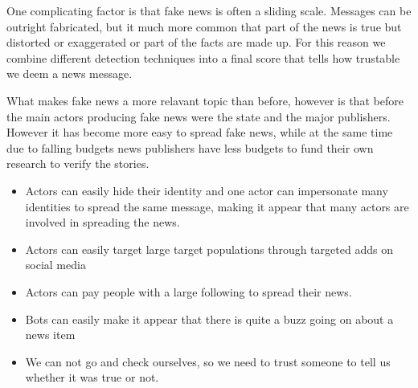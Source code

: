 \documentclass[10pt, a4paper, twocolumn]{article} %
\begin{document}
One complicating factor is that fake news is often a sliding scale. Messages can be outright fabricated, but it much more common that part of the news is true but distorted or exaggerated or part of the facts are made up. For this reason we combine different detection techniques into a final score that tells how trustable we deem a news message. 

What makes fake news a more relavant topic than before, however is that before the main actors producing fake news were the state and the major publishers. However it has become more easy to spread fake news, while at the same time due to falling budgets news publishers have less budgets to fund their own research to verify the stories.
\begin{itemize}
\item Actors can easily hide their identity and one actor can impersonate many identities to spread the same message, making it appear that many actors are involved in spreading the news.
\item Actors can easily target large target populations through targeted adds on social media
\item Actors can pay people with a large following to spread their news.
\item Bots can easily make it appear that there is quite a buzz going on about a news item
\item We can not go and check ourselves, so we need to trust someone to tell us whether it was true or not.
\end{itemize}
\end{document}

